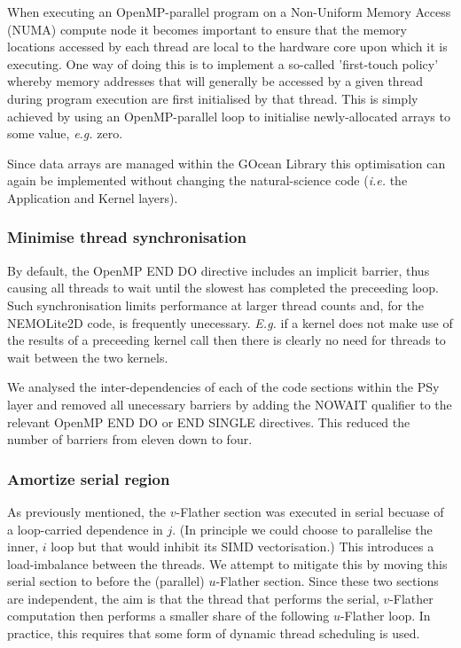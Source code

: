 \documentclass[journal]{IEEEtran}
\begin{document}
When executing an OpenMP-parallel program on a Non-Uniform Memory
Access (NUMA) compute node it becomes important to ensure that the
memory locations accessed by each thread are local to the hardware
core upon which it is executing. One way of doing this is to implement
a so-called 'first-touch policy' whereby memory addresses that will
generally be accessed by a given thread during program execution are
first initialised by that thread. This is simply achieved by using an
OpenMP-parallel loop to initialise newly-allocated arrays to some
value, {\it e.g.} zero.

Since data arrays are managed within the GOcean Library this
optimisation can again be implemented without changing the
natural-science code ({\it i.e.} the Application and Kernel layers).

\subsubsection{Minimise thread synchronisation}
\label{sec_synch}

By default, the OpenMP END DO directive includes an implicit barrier,
thus causing all threads to wait until the slowest has completed the
preceeding loop. Such synchronisation limits performance at larger
thread counts and, for the NEMOLite2D code, is frequently unecessary.
{\it E.g.} if a kernel does not make use of the results of a
preceeding kernel call then there is clearly no need for threads to
wait between the two kernels.

We analysed the inter-dependencies of each of the code sections within
the PSy layer and removed all unecessary barriers by adding the NOWAIT
qualifier to the relevant OpenMP END DO or END SINGLE directives. This
reduced the number of barriers from eleven down to four.

\subsubsection{Amortize serial region}
\label{sec_amortize}

As previously mentioned, the $v$-Flather section was executed in
serial becuase of a loop-carried dependence in $j$. (In principle we
could choose to parallelise the inner, $i$ loop but that would inhibit
its SIMD vectorisation.) This introduces a load-imbalance between the
threads. We attempt to mitigate this by moving this serial section to
before the (parallel) $u$-Flather section. Since these two sections are
independent, the aim is that the thread that performs the serial,
$v$-Flather computation then performs a smaller share of the following
$u$-Flather loop. In practice, this requires that some form of dynamic
thread scheduling is used.
\end{document}
